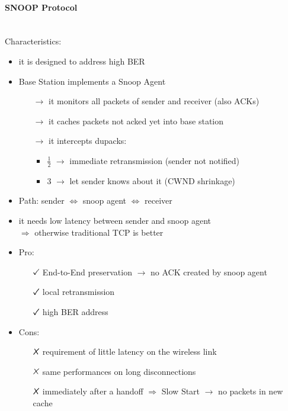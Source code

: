 \paragraph{SNOOP Protocol} \mbox{}\\[0.2cm]
Characteristics:
\begin{itemize}
    \item it is designed to address high BER
    \item Base Station implements a Snoop Agent
    \begin{itemize}
        \item[$\rightarrow$] it monitors all packets of sender and receiver (also ACKs)
        \item[$\rightarrow$] it caches packets not acked yet into base station
        \item[$\rightarrow$] it intercepts dupacks:
        \begin{itemize}
            \item $\frac{1}{2}$ $\rightarrow$ immediate retransmission (sender not notified)
            \item 3 $\rightarrow$ let sender knows about it (CWND shrinkage)
        \end{itemize}
    \end{itemize}
    \item Path: sender $\Leftrightarrow$ snoop agent $\Leftrightarrow$ receiver
    \item it needs low latency between sender and snoop agent\\$\Rightarrow$
    otherwise traditional TCP is better
    \item Pro:
    \begin{itemize}
        \item[$\tikzcmark$] End-to-End preservation $\rightarrow$ no ACK created by snoop agent
        \item[$\tikzcmark$] local retransmission
        \item[$\tikzcmark$] high BER address 
    \end{itemize}
    \item Cons:
    \begin{itemize}
        \item[$\tikzxmark$] requirement of little latency on the wireless link
        \item[$\tikzxmark$] same performances on long disconnections
        \item[$\tikzxmark$] immediately after a handoff $\Rightarrow$ Slow Start $\rightarrow$
        no packets in new cache
    \end{itemize}
\end{itemize}

